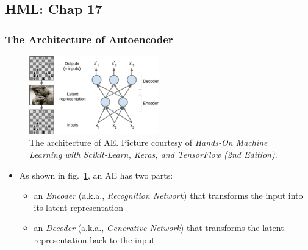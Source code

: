\documentclass{beamer}
\begin{document}
\subsection{HML: Chap 17}
\begin{frame}
\setlength{\leftmargini}{0.3cm}
\setlength{\leftmarginii}{0.6cm}
\setlength{\leftmarginiii}{0.9cm}
\frametitle{The Architecture of Autoencoder}
\begin{figure}[h!]
\centering
\includegraphics[width=0.5\textwidth]{./figure/ae}
\caption{The architecture of AE. Picture courtesy of \emph{Hands-On Machine Learning with Scikit-Learn, Keras, and TensorFlow (2nd Edition).}}\label{fig:ae}
\end{figure}
\vspace{-0.5cm}
\begin{itemize}
\footnotesize
\item As shown in fig.~\ref{fig:ae}, an AE has two parts:
	\begin{itemize}
	\footnotesize
	\item an \emph{Encoder} (a.k.a., \emph{Recognition Network}) that transforms the input into its latent representation
	\item an \emph{Decoder} (a.k.a., \emph{Generative Network}) that transforms the latent representation back to the input  
	\end{itemize}
\end{itemize}
\end{frame}
\end{document}
